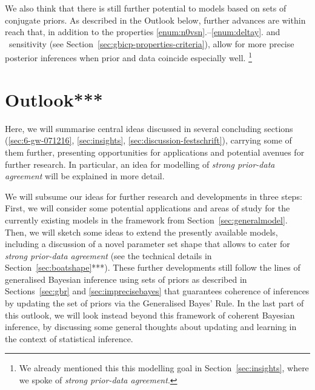 We also think that there is still further potential to models based on sets of conjugate priors.
As described in the Outlook below,
further advances are within reach 
that, in addition to the properties \ref{enum:n0vsn}.--\ref{enum:deltay}. and \pdc\ sensitivity
(see Section~\ref{sec:gbicp-properties-criteria}),
allow for more precise posterior inferences when prior and data coincide especially well.%
\footnote{We already mentioned this this modelling goal in Section~\ref{sec:insights},
where we spoke of \emph{strong prior-data agreement}.}



\section{Outlook***}
\label{sec:concluding-outlook}

Here, we will summarise central ideas discussed in several concluding sections
(\ref{sec:6-gw-071216}, \ref{sec:insights}, \ref{sec:discussion-festschrift}),
carrying some of them further, presenting %
opportunities for applications and potential avenues for further research.
In particular, an idea for modelling of \emph{strong prior-data agreement} will be explained in more detail.

We will subsume our ideas for further research and developments in three steps:
First, we will consider some potential applications and areas of study for the
currently existing models in the framework from Section~\ref{sec:generalmodel}.
Then, we will sketch some ideas to extend the presently available models,
including a discussion of a novel parameter set shape that allows to cater for
\emph{strong prior-data agreement} (see the technical details in Section~\ref{sec:boatshape}***).
These further developments still follow the lines %
of generalised Bayesian inference using sets of priors as described in Sections~\ref{sec:gbr} and \ref{sec:imprecisebayes}
that guarantees coherence of inferences by updating the set of priors via the Generalised Bayes' Rule.
In the last part of this outlook, we will look instead beyond this framework
of coherent Bayesian inference, by discussing some general thoughts
about updating and learning in the context of statistical inference.

\medskip

